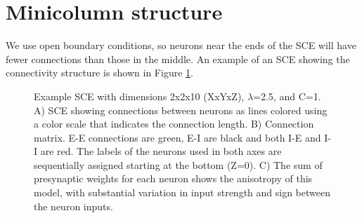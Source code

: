\section{Minicolumn structure}
We use open boundary conditions, so neurons near the ends of the SCE will have fewer connections than those in the middle.
An example of an SCE showing the connectivity structure is shown in Figure \ref{fig:column_structure}.
\begin{figure}[!htb]
  \caption{Example SCE with dimensions 2x2x10 (XxYxZ), $\lambda$=2.5, and C=1. A)  SCE showing connections between neurons as lines colored using a color scale that indicates the connection length. 
    B)  Connection matrix. E-E connections are green, E-I are black and both I-E and I-I  are red. 
    The labels of the neurons used in both axes are sequentially assigned starting at the bottom (Z=0).
    C) The sum of presynaptic weights for each neuron shows the anisotropy of this model, with substantial variation in input strength and sign between the neuron inputs.}
  \label{fig:column_structure}
\end{figure}

